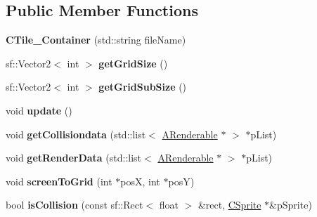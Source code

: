 \subsection*{Public Member Functions}
\begin{DoxyCompactItemize}
\item 
\hypertarget{classCTile__Container_ab3f79e82961b644d422874eb558ea312}{{\bfseries C\-Tile\-\_\-\-Container} (std\-::string file\-Name)}\label{classCTile__Container_ab3f79e82961b644d422874eb558ea312}

\item 
\hypertarget{classCTile__Container_ae8a4d2b6e49fbec47d92cbb19bb9d3c7}{sf\-::\-Vector2$<$ int $>$ {\bfseries get\-Grid\-Size} ()}\label{classCTile__Container_ae8a4d2b6e49fbec47d92cbb19bb9d3c7}

\item 
\hypertarget{classCTile__Container_a876984278369d0cafc24890959128ed0}{sf\-::\-Vector2$<$ int $>$ {\bfseries get\-Grid\-Sub\-Size} ()}\label{classCTile__Container_a876984278369d0cafc24890959128ed0}

\item 
\hypertarget{classCTile__Container_abe6e19de544f042671094697bb83fde9}{void {\bfseries update} ()}\label{classCTile__Container_abe6e19de544f042671094697bb83fde9}

\item 
\hypertarget{classCTile__Container_ae61b573ed7b47bea750040a26b492632}{void {\bfseries get\-Collisiondata} (std\-::list$<$ \hyperlink{classARenderable}{A\-Renderable} $\ast$ $>$ $\ast$p\-List)}\label{classCTile__Container_ae61b573ed7b47bea750040a26b492632}

\item 
\hypertarget{classCTile__Container_a48c74611efadee522595362a79620bff}{void {\bfseries get\-Render\-Data} (std\-::list$<$ \hyperlink{classARenderable}{A\-Renderable} $\ast$ $>$ $\ast$p\-List)}\label{classCTile__Container_a48c74611efadee522595362a79620bff}

\item 
\hypertarget{classCTile__Container_a14f90644c3a992813a629cea3e81aa38}{void {\bfseries screen\-To\-Grid} (int $\ast$pos\-X, int $\ast$pos\-Y)}\label{classCTile__Container_a14f90644c3a992813a629cea3e81aa38}

\item 
\hypertarget{classCTile__Container_adfda15836508531632c4ca506caf6360}{bool {\bfseries is\-Collision} (const sf\-::\-Rect$<$ float $>$ \&rect, \hyperlink{classCSprite}{C\-Sprite} $\ast$\&p\-Sprite)}\label{classCTile__Container_adfda15836508531632c4ca506caf6360}


\end{DoxyCompactItemize}
